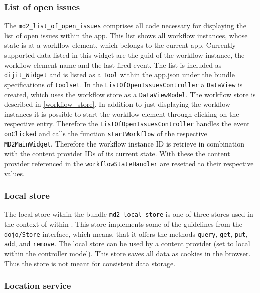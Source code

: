 \subsubsection{List of open issues}
\label{sec:listOfOpenIssues}

The \lstinline!md2_list_of_open_issues! comprises all code necessary for displaying the list of open issues within the app. This list shows all workflow instances, whose state is at a workflow element, which belongs to the current app. Currently supported data listed in this widget are the guid of the workflow instance, the workflow element name and the last fired event. 
The list is included as \lstinline!dijit_Widget! and is listed as a \texttt{Tool} within the app.json under the bundle specifications of \lstinline!toolset!. In the \lstinline!ListOfOpenIssuesController! a \lstinline!DataView! is created, which uses the workflow store as a \lstinline!DataViewModel!. The workflow store is described in \cref{workflow_store}.
In addition to just displaying the workflow instances it is possible to start the workflow element through clicking on the respective entry. Therefore the \lstinline!ListOfOpenIssuesController! handles the event \lstinline!onClicked! and calls the function \lstinline!startWorkflow! of the respective \lstinline!MD2MainWidget!. Therefore the workflow instance ID is retrieve in combination with the content provider IDs of its current state. With these the content provider referenced in the \lstinline!workflowStateHandler! are resetted to their respective values.

\subsubsection{Local store} \label{local_store}



The local store within the bundle \lstinline|md2_local_store| is one of three stores used in the context of \mapapps within \MD. This store implements some of the guidelines from the \lstinline|dojo/Store| interface, which means, that it offers the methods \lstinline|query|, \lstinline|get|, \lstinline|put|, \lstinline|add|, and \lstinline|remove|.
The local store can be used by a content provider (set to local within the controller model). This store saves all data as cookies in the browser. Thus the store is not meant for consistent data storage.

\subsubsection{Location service}

